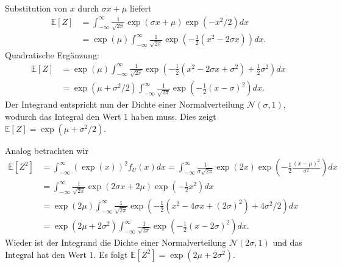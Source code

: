 \documentclass{article}
\begin{document}
\begin{enumerate}[label=(\alph*)]
	      Substitution von $x$ durch $\sigma x + \mu$ liefert
	      \begin{align*}
		      \mathds{E}[Z] & = \int_{-\infty}^{\infty} \frac{1}{\sqrt{2 \pi}} \exp(\sigma x + \mu) \exp(-x^2/2) dx                                 \\
		                    & = \exp(\mu) \int_{-\infty}^{\infty} \frac{1}{\sqrt{2\pi}} \exp\left(-\frac{1}{2} (x^2 - 2 \sigma x )\right)dx\text{.}
	      \end{align*}
	      Quadratische Ergänzung:
	      \begin{align*}
		      \mathds{E}[Z] & = \exp(\mu) \int_{-\infty}^{\infty} \frac{1}{\sqrt{2\pi}} \exp\left(-\frac{1}{2} (x^2 - 2 \sigma x + \sigma^2 ) + \frac{1}{2} \sigma^2\right)dx \\
		                    & = \exp(\mu + \sigma^2/2)  \int_{-\infty}^{\infty} \frac{1}{\sqrt{2\pi}} \exp\left(-\frac{1}{2} (x - \sigma)^2\right)dx\text{.}
	      \end{align*}
	      Der Integrand entspricht nun der Dichte einer Normalverteilung $\mathcal{N}(\sigma, 1)$, wodurch das Integral den Wert $1$ haben muss. Dies zeigt $\mathds{E}[Z] = \exp(\mu + \sigma^2/2)$.

	      Analog betrachten wir
	      \begin{align*}
		      \mathds{E}[Z^2] & = \int_{-\infty}^{\infty} (\exp(x))^2 f_U(x) dx = \int_{-\infty}^{\infty} \frac{1}{\sigma \sqrt{2 \pi}} \exp(2x) \exp\left(- \frac{1}{2} \frac{(x - \mu)^2}{\sigma^2}\right) dx \\
		                      & = \int_{-\infty}^{\infty} \frac{1}{\sqrt{2 \pi}} \exp(2 \sigma x + 2 \mu) \exp\left(- \frac{1}{2} x^2\right) dx                                                                 \\
		                      & = \exp(2 \mu) \int_{-\infty}^{\infty} \frac{1}{\sqrt{2 \pi}}\exp\left(- \frac{1}{2} (x^2 - 4 \sigma x + (2 \sigma)^2) + 4 \sigma^2 / 2\right) dx                                \\
		                      & = \exp(2 \mu + 2 \sigma^2) \int_{-\infty}^{\infty} \frac{1}{\sqrt{2 \pi}}\exp\left(- \frac{1}{2} (x-2\sigma)^2\right) dx\text{.}
	      \end{align*}
	      Wieder ist der Integrand die Dichte einer Normalverteilung $\mathcal{N}(2 \sigma, 1)$ und das Integral hat den Wert $1$. Es folgt $\mathds{E}[Z^2] = \exp(2 \mu + 2 \sigma^2)$.
\end{enumerate}

\subsection{}
\end{document}
